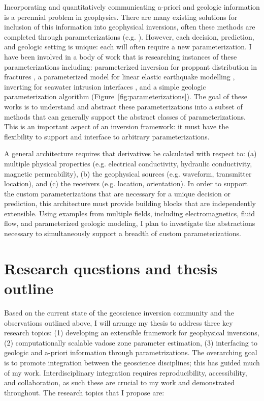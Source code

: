 \documentclass[11pt]{article}
\begin{document}
Incorporating and quantitatively communicating a-priori and geologic information is a perennial problem in geophysics.
There are many existing solutions for inclusion of this information into geophysical inversions, often these methods are completed through parameterizations (e.g. \cite{Oldenburga,Li1998a,liol96,Pidlisecky2007,Pidlisecky2011,McMillan2015}). However, each  decision, prediction, and geologic setting is unique: each will often require a new parameterization. I have been involved in a body of work that is researching instances of these parameterizations including: parameterized inversion for proppant distribution in fractures \citep{HeagySEG2014}, a parameterized model for linear elastic earthquake modelling \citep{Cockett2014b}, inverting for seawater intrusion interfaces \citep{Kang2015}, and a simple geologic parameterization algorithm \citep{Cockett2016,Cockett2013b,Cockett2012} (Figure~\ref{fig:parameterizations}). The goal of these works is to understand and abstract these parameterizations into a subset of methods that can generally support the abstract classes of parameterizations. This is an important aspect of an inversion framework: it must have the flexibility to support and interface to arbitrary parameterizations.


A general architecture requires that derivatives be calculated with respect to: (a) multiple physical properties (e.g. electrical conductivity, hydraulic conductivity, magnetic permeability), (b) the geophysical sources (e.g. waveform, transmitter location), and (c) the receivers (e.g. location, orientation).
In order to support the custom parameterizations that are necessary for a unique decision or prediction, this architecture must provide building blocks that are independently extensible. Using examples from multiple fields, including electromagnetics, fluid flow, and parameterized geologic modeling, I plan to investigate the abstractions necessary to simultaneously support a breadth of custom parameterizations.



\section{Research questions and thesis outline}

Based on the current state of the geoscience inversion community and the observations outlined above, I will arrange my thesis to address three key research topics: (1) developing an extensible framework for geophysical inversions, (2) computationally scalable vadose zone parameter estimation, (3) interfacing to geologic and a-priori information through parametrizations. The overarching goal is to promote integration between the geoscience disciplines; this has guided much of my work. Interdisciplinary integration requires reproducibility, accessibility, and collaboration, as such these are crucial to my work and demonstrated throughout. The research topics that I propose are:
\end{document}
